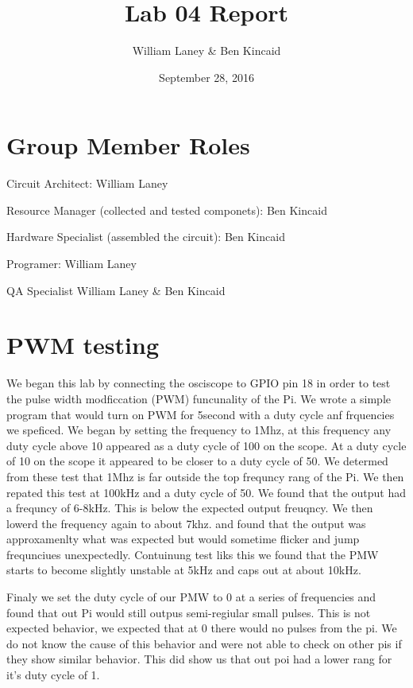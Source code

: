 \documentclass[prl,12pt,notitlepage,aps,onecolumn,superscriptaddress]{revtex4-1}
\begin{document}
\title{Lab 04 Report}
\author{William Laney \& Ben Kincaid}
\date{September 28, 2016}
\maketitle

\section{Group Member Roles}

Circuit Architect: William Laney

Resource Manager (collected and tested componets): Ben Kincaid

Hardware Specialist (assembled the circuit): Ben Kincaid

Programer: William Laney

QA Specialist William Laney \& Ben Kincaid

\section{PWM testing}
We began this lab by connecting the osciscope to GPIO pin 18 in order to test the pulse width modficcation (PWM) funcunality of the Pi. We wrote a simple program that would turn on PWM for 5second with a duty cycle anf frquencies we speficed. We began by setting the frequency to 1Mhz, at this frequency any duty cycle above 10 appeared as a duty cycle of 100 on the scope. At a duty cycle of 10 on the scope it appeared to be closer to a duty cycle of 50. We determed from these test that 1Mhz is far outside the top frequncy rang of the Pi. We then repated this test at 100kHz and a duty cycle of 50. We found that the output had a frequncy of 6-8kHz. This is below the expected output freuqncy. We then lowerd the frequency again to about 7khz. and found that the output was approxamenlty what was expected but would sometime flicker and jump frequnciues unexpectedly. Contuinung test liks this we found that the PMW starts to become slightly unstable at 5kHz and caps out at about 10kHz.

Finaly we set the duty cycle of our PMW to 0 at a series of frequencies and found that out Pi would still outpus semi-regiular small pulses. This is not expected behavior, we expected that at 0 there would no pulses from the pi. We do not know the cause of this behavior and were not able to check on other pis if they show similar behavior. This did show us that out poi had a lower rang for it's duty cycle of 1. 
\end{document}
